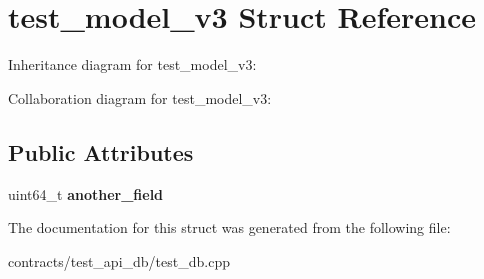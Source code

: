 \hypertarget{structtest__model__v3}{}\section{test\+\_\+model\+\_\+v3 Struct Reference}
\label{structtest__model__v3}


Inheritance diagram for test\+\_\+model\+\_\+v3\+:


Collaboration diagram for test\+\_\+model\+\_\+v3\+:
\subsection*{Public Attributes}
\begin{DoxyCompactItemize}
\item 
\mbox{\label{structtest__model__v3_a68ae6fc47affb3f08d408503b9baed9d}} 
uint64\+\_\+t {\bfseries another\+\_\+field}
\end{DoxyCompactItemize}


The documentation for this struct was generated from the following file\+:\begin{DoxyCompactItemize}
\item 
contracts/test\+\_\+api\+\_\+db/test\+\_\+db.\+cpp\end{DoxyCompactItemize}
